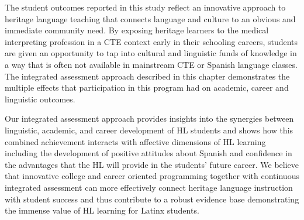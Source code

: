 \documentclass[output=paper]{langscibook}
\begin{document}
The student outcomes reported in this study reflect an innovative approach to heritage language teaching that connects language and culture to an obvious and immediate community need. By exposing heritage learners to the medical interpreting profession in a CTE context early in their schooling careers, students are given an opportunity to tap into cultural and linguistic funds of knowledge in a way that is often not available in mainstream CTE or Spanish language classes. The integrated assessment approach described in this chapter demonstrates the multiple effects that participation in this program had on academic, career and linguistic outcomes.

Our integrated assessment approach provides insights into the synergies between linguistic, academic, and career development of HL students and shows how this combined achievement interacts with affective dimensions of HL learning including the development of positive attitudes about Spanish and confidence in the advantages that the HL will provide in the students’ future career. We believe that innovative college and career oriented programming together with continuous integrated assessment can more effectively connect heritage language instruction with student success and thus contribute to a robust evidence base demonstrating the immense value of HL learning for Latinx students.


{\sloppy\printbibliography[heading=subbibliography,notkeyword=this]}
\end{document}

